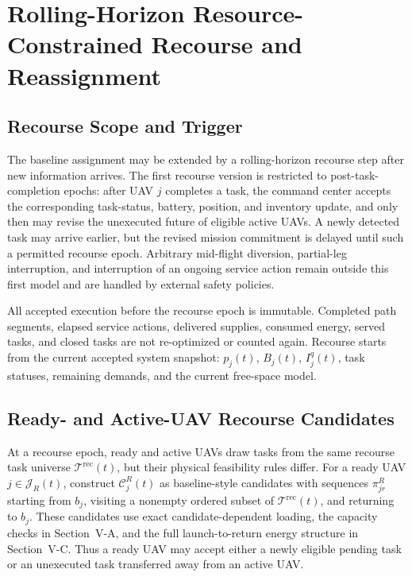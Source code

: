 \documentclass[conference]{IEEEtran}
\begin{document}
\section{Rolling-Horizon Resource-Constrained Recourse and Reassignment}
\subsection{Recourse Scope and Trigger}
The baseline assignment may be extended by a rolling-horizon recourse step after new information arrives. The first recourse version is restricted to post-task-completion epochs: after UAV $j$ completes a task, the command center accepts the corresponding task-status, battery, position, and inventory update, and only then may revise the unexecuted future of eligible active UAVs. A newly detected task may arrive earlier, but the revised mission commitment is delayed until such a permitted recourse epoch. Arbitrary mid-flight diversion, partial-leg interruption, and interruption of an ongoing service action remain outside this first model and are handled by external safety policies.

All accepted execution before the recourse epoch is immutable. Completed path segments, elapsed service actions, delivered supplies, consumed energy, served tasks, and closed tasks are not re-optimized or counted again. Recourse starts from the current accepted system snapshot: $p_j(t)$, $B_j(t)$, $I_j^q(t)$, task statuses, remaining demands, and the current free-space model.

\subsection{Ready- and Active-UAV Recourse Candidates}
At a recourse epoch, ready and active UAVs draw tasks from the same recourse task universe $\mathcal T^{\mathrm{rec}}(t)$, but their physical feasibility rules differ. For a ready UAV $j\in\mathcal J_R(t)$, construct $\mathcal C_j^R(t)$ as baseline-style candidates with sequences $\pi_{jr}^{R}$ starting from $b_j$, visiting a nonempty ordered subset of $\mathcal T^{\mathrm{rec}}(t)$, and returning to $b_j$. These candidates use exact candidate-dependent loading, the capacity checks in Section~V-A, and the full launch-to-return energy structure in Section~V-C. Thus a ready UAV may accept either a newly eligible pending task or an unexecuted task transferred away from an active UAV.
\end{document}
